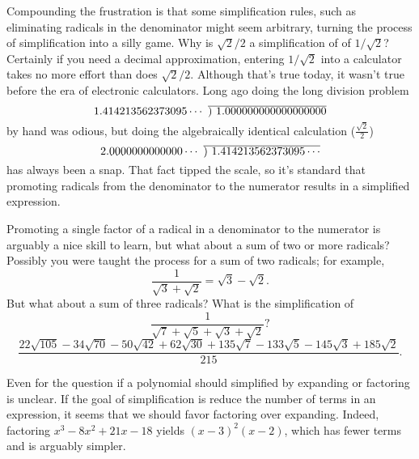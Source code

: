 \documentclass[12pt,fleqn]{article}
\newcommand\showdiv[1]{\overline{\smash{)}#1}}
\begin{document}
\begin{comment}
You needn't be especially cynical to speculate that the only
reason for the requirement of simplified answers is to reduce the 
teacher's burden of grading papers--it is much easier to simply mark 
any answer that isn't visually identical to the answer key as wrong.
\end{comment}
Compounding the frustration is that some simplification rules, such as eliminating radicals in the 
denominator might seem arbitrary, turning the process of simplification 
into a silly game. Why is $\sqrt{2}/2$ a simplification of 
of $1/\sqrt{2}$? Certainly if you need a decimal approximation, entering
$1/\sqrt{2}$ into a calculator takes no more effort than does $\sqrt{2}/2$. Although
that's true today, it wasn't true before the era of electronic calculators. Long
ago doing the long division problem 
\[
   1.414213562373095\cdots \, \, \showdiv{\, \, 1.000000000000000000}
\]
by hand was odious, but doing the algebraically identical calculation 
(\(\frac{\sqrt{2}}{2} \))
\[
   2.0000000000000\cdots \,\, \showdiv{\, \, 1.414213562373095\cdots}
 \]
 has always been a snap. That fact tipped the scale, so it's standard that promoting
 radicals from the denominator to the numerator results in a simplified
 expression.

 Promoting a single factor of a radical in a denominator to the numerator
 is arguably a nice skill to learn, but what about a sum of two or more
 radicals? Possibly you were taught the process for a sum of two radicals; for
 example,
 \begin{equation}
   \frac{1}{\sqrt{3}+\sqrt{2}} = \sqrt{3}-\sqrt{2}.
 \end{equation}
But what about a sum of three radicals? What is the simplification of
\begin{equation}
   \frac{1}{\sqrt{7}+\sqrt{5}+\sqrt{3}+\sqrt{2}} \mbox{?}
\end{equation}
\begin{equation}
   \frac{22 \sqrt{105}- 34 \sqrt{70}- 50 \sqrt{42}+62 \sqrt{30}+135 \sqrt{7}- 133 \sqrt{5}-145 \sqrt{3}+185 \sqrt{2}}{215}.
\end{equation}


 Even for the question if a polynomial should simplified by expanding
 or factoring is unclear. If the goal of simplification is reduce the
 number of terms in an expression, it seems that we should favor 
 factoring over expanding. Indeed, factoring ${{x}^{3}}-8 {{x}^{2}}+21 x-18$
 yields ${{\left( x-3\right) }^{2}} \left( x-2\right)$, which has fewer
 terms and is arguably simpler. 
\end{document}
